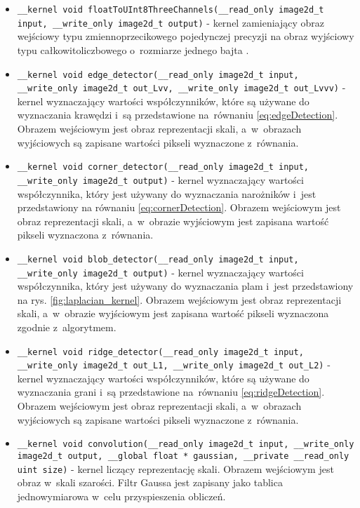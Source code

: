 \begin{itemize}
\item 
\texttt{\_\_kernel void  floatToUInt8ThreeChannels(\_\_read\_only image2d\_t input, \_\_write\_only image2d\_t output)} - kernel zamieniający obraz wejściowy typu zmiennoprzecikowego pojedynczej precyzji na obraz wyjściowy typu całkowitoliczbowego o~rozmiarze jednego bajta .

\item 
\texttt{\_\_kernel void  edge\_detector(\_\_read\_only image2d\_t input, \_\_write\_only image2d\_t out\_Lvv, \_\_write\_only image2d\_t out\_Lvvv)} - kernel wyznaczający wartości współczynników, które są używane do wyznaczania krawędzi i~są przedstawione na~równaniu \eqref{eq:edgeDetection}. Obrazem wejściowym jest obraz reprezentacji skali, a~w~obrazach wyjściowych są zapisane wartości pikseli wyznaczone z~równania.

\item 
\texttt{\_\_kernel void  corner\_detector(\_\_read\_only image2d\_t input, \_\_write\_only image2d\_t output)} - kernel wyznaczający wartości współczynnika, który jest używany do wyznaczania narożników i~jest przedstawiony na równaniu \eqref{eq:cornerDetection}. Obrazem wejściowym jest obraz reprezentacji skali, a~w~obrazie wyjściowym jest zapisana wartość pikseli wyznaczona z~równania.

\item 
\texttt{\_\_kernel void  blob\_detector(\_\_read\_only image2d\_t input, \_\_write\_only image2d\_t output)} - kernel wyznaczający wartości współczynnika, który jest używany do wyznaczania plam i~jest przedstawiony na rys. \ref{fig:laplacian_kernel}. Obrazem wejściowym jest obraz reprezentacji skali, a~w~obrazie wyjściowym jest zapisana wartość pikseli wyznaczona zgodnie z~algorytmem.

\item 
\texttt{\_\_kernel void  ridge\_detector(\_\_read\_only image2d\_t input, \_\_write\_only image2d\_t out\_L1, \_\_write\_only image2d\_t out\_L2)} - kernel wyznaczający wartości współczynników, które są używane do wyznaczania grani i~są przedstawione na~równaniu \eqref{eq:ridgeDetection}. Obrazem wejściowym jest obraz reprezentacji skali, a~w~obrazach wyjściowych są zapisane wartości pikseli wyznaczone z~równania.

\item 
\texttt{\_\_kernel void  convolution(\_\_read\_only image2d\_t input, \_\_write\_only image2d\_t output, \_\_global float * gaussian, \_\_private \_\_read\_only uint size)} - kernel liczący reprezentację skali. Obrazem wejściowym jest obraz w~skali szarości. Filtr Gaussa jest zapisany jako tablica jednowymiarowa w~celu przyspieszenia obliczeń.

\end{itemize}
